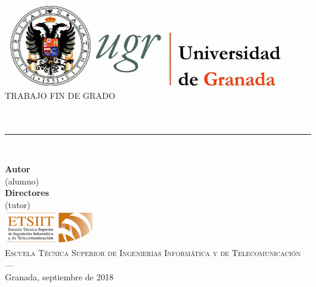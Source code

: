 \begin{titlepage}
 
\newlength{\centeroffset}
\setlength{\centeroffset}{-0.5\oddsidemargin}
\addtolength{\centeroffset}{0.5\evensidemargin}
\thispagestyle{empty}

\noindent\hspace*{\centeroffset}\begin{minipage}{\textwidth}

\centering
\includegraphics[width=0.9\textwidth]{imagenes/logo_ugr.jpg}\\[1cm]

\textsc{ \Large TRABAJO FIN DE GRADO\\[0.2cm]}
\textsc{ \myDegree}\\[1cm]
% 
{\Huge \bfseries \myTitle \\
}
\noindent\rule[-1ex]{\textwidth}{3pt}\\[3.5ex]
\end{minipage}

\vspace{1cm}
\noindent\hspace*{\centeroffset}\begin{minipage}{\textwidth}
\centering

\textbf{Autor}\\ {\myName (alumno)}\\[2.5ex]
\textbf{Directores}\\ {\myProf (tutor)}\\[3.5ex]
\includegraphics[width=0.3\textwidth]{imagenes/etsiit_logo.png}\\[0.5cm]
\textsc{Escuela Técnica Superior de Ingenierías Informática y de Telecomunicación}\\
\textsc{---}\\
Granada, septiembre de 2018
\end{minipage}
\end{titlepage}


